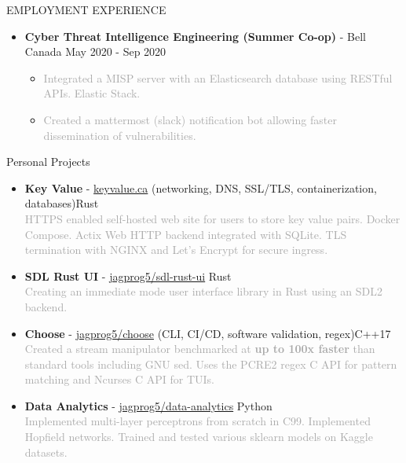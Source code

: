 \documentclass{resume} %
\begin{document}
\begin{rSection}{EMPLOYMENT EXPERIENCE}
\begin{itemize}
\begin{itemize}[topsep=-8pt]
            \end{itemize}
        \item {\bf Cyber Threat Intelligence Engineering (Summer Co-op)} - Bell Canada \hfill {May 2020 - Sep 2020}
        \begin{itemize}[topsep=-8pt]
            \setlength\itemsep{-0.3em}
            \item[\textbullet] \textcolor{darkgray}{Integrated a MISP server with an Elasticsearch database using RESTful APIs. Elastic Stack.}
            \item[\textbullet] \textcolor{darkgray}{Created a mattermost (slack) notification bot allowing faster dissemination of vulnerabilities.}
        \end{itemize}
    \end{itemize}
\end{rSection}

\begin{rSection}{Personal Projects}
    \begin{itemize}
        \setlength\itemsep{-0.3em}
        \item {\bf Key Value} - \href{http://www.keyvalue.ca/}{keyvalue.ca} (networking, DNS, SSL/TLS, containerization, databases)\hfill Rust\\
        \textcolor{darkgray}{HTTPS enabled self-hosted web site for users to store key value pairs. Docker Compose. Actix Web HTTP backend integrated with SQLite. TLS termination with NGINX and Let's Encrypt for secure ingress.}
        \item {\bf SDL Rust UI} - \href{https://github.com/jagprog5/sdl-rust-ui}{jagprog5/sdl-rust-ui} \hfill Rust\\
        \textcolor{darkgray}{Creating an immediate mode user interface library in Rust using an SDL2 backend.}
        \item {\bf Choose} - \href{https://github.com/jagprog5/choose/}{jagprog5/choose} (CLI, CI/CD, software validation, regex)\hfill C++17\\
        \textcolor{darkgray}{Created a stream manipulator benchmarked at \textbf{up to 100x faster} than standard tools including GNU sed.
        Uses the PCRE2 regex C API for pattern matching and Ncurses C API for TUIs.}
        \item {\bf Data Analytics} - \href{https://github.com/jagprog5/resume/blob/main/data-analytics-projects.md}{jagprog5/data-analytics} \hfill Python\\
        \textcolor{darkgray}{Implemented multi-layer perceptrons from scratch in C99. Implemented Hopfield networks. \hfill  \break Trained and tested various sklearn models on Kaggle datasets.}
    \end{itemize}
\end{rSection}
\end{document}
